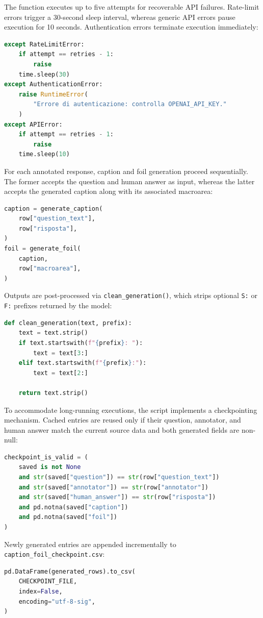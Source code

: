 The function executes up to five attempts for recoverable API failures. Rate-limit errors trigger a 30-second sleep interval, whereas generic API errors pause execution for 10 seconds. Authentication errors terminate execution immediately:
\begin{lstlisting}[language=Python]
except RateLimitError:
    if attempt == retries - 1:
        raise
    time.sleep(30)
except AuthenticationError:
    raise RuntimeError(
        "Errore di autenticazione: controlla OPENAI_API_KEY."
    )
except APIError:
    if attempt == retries - 1:
        raise
    time.sleep(10)
\end{lstlisting}
For each annotated response, caption and foil generation proceed sequentially. The former accepts the question and human answer as input, whereas the latter accepts the generated caption along with its associated macroarea:
\begin{lstlisting}[language=Python]
caption = generate_caption(
    row["question_text"],
    row["risposta"],
)
foil = generate_foil(
    caption,
    row["macroarea"],
)
\end{lstlisting}
Outputs are post-processed via \texttt{clean\_generation()}, which strips optional \texttt{S:} or \texttt{F:} prefixes returned by the model:
\begin{lstlisting}[language=Python]
def clean_generation(text, prefix):
    text = text.strip()
    if text.startswith(f"{prefix}: "):
        text = text[3:]
    elif text.startswith(f"{prefix}:"):
        text = text[2:]

    return text.strip()
\end{lstlisting}
To accommodate long-running executions, the script implements a checkpointing mechanism. Cached entries are reused only if their question, annotator, and human answer match the current source data and both generated fields are non-null:
\begin{lstlisting}[language=Python]
checkpoint_is_valid = (
    saved is not None
    and str(saved["question"]) == str(row["question_text"])
    and str(saved["annotator"]) == str(row["annotator"])
    and str(saved["human_answer"]) == str(row["risposta"])
    and pd.notna(saved["caption"])
    and pd.notna(saved["foil"])
)
\end{lstlisting}
Newly generated entries are appended incrementally to \texttt{caption\_foil\_checkpoint.csv}:
\begin{lstlisting}[language=Python]
pd.DataFrame(generated_rows).to_csv(
    CHECKPOINT_FILE,
    index=False,
    encoding="utf-8-sig",
)
\end{lstlisting}
